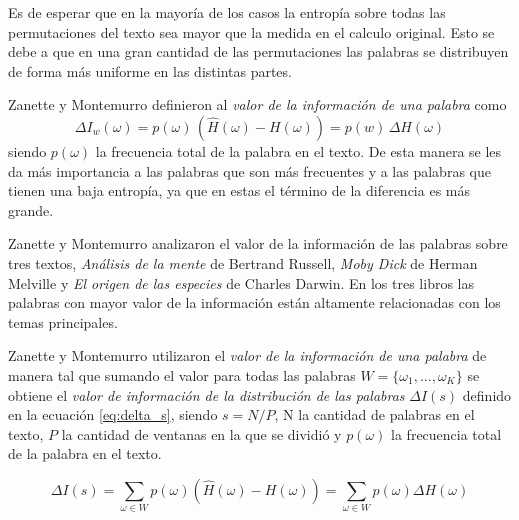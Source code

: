 
Es de esperar que en la mayoría de los casos 
la entropía sobre todas las permutaciones del texto sea mayor que la medida en el calculo original. Esto 
se debe a que en una gran cantidad de las permutaciones las palabras se distribuyen de forma más uniforme 
en las distintas partes.

Zanette y Montemurro definieron al \textit{valor de la información de una palabra} como
 \begin{equation}
  \Delta I_w(\omega) = p(\omega) \,  (\widehat{H}(\omega) - H(\omega))  =  p(w) \, \Delta{H(\omega)}
 \end{equation}
siendo $p(\omega)$ la frecuencia total de la palabra en el texto.
De esta manera se les da más importancia a las palabras que son más frecuentes y a las palabras que tienen una baja entropía, ya que en estas el término de la diferencia es más grande.

Zanette y Montemurro analizaron el valor de la información de las palabras sobre tres textos, \textit{Análisis de la mente} de Bertrand Russell, 
\textit{Moby Dick} de Herman Melville y \textit{El origen de las especies} de Charles Darwin. 
En los tres libros las palabras con mayor valor de la información están 
altamente relacionadas con los temas principales. 


Zanette y Montemurro utilizaron el \textit{valor de la información de una palabra} de manera tal que sumando el valor para todas las palabras $W = \{\omega_1,\dots,\omega_K\}$ se obtiene el \textit{valor de información de la distribución de las palabras} $\Delta I(s)$ definido en la ecuación \ref{eq:delta_s}, siendo  $s = N/P$, N la cantidad de palabras en el texto, $P$ la cantidad de ventanas en la que se dividió y $p(\omega)$ la frecuencia total de la palabra en el texto.

\begin{equation}
  \Delta I(s) = \sum\limits_{\omega \in W } p(\omega) (\widehat{H}(\omega) - H(\omega)) = \sum\limits_{\omega \in W } p(\omega) \Delta H(\omega) 
  \label{eq:delta_s}
\end{equation}

